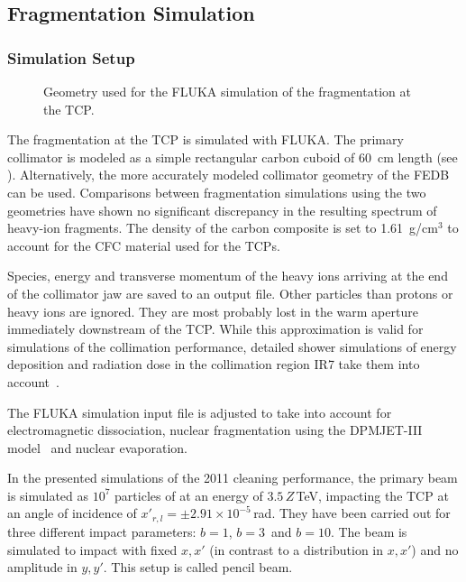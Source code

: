 \subsection{Fragmentation Simulation} \label{chap:STIERfrag}
%
\subsubsection{Simulation Setup}
%
\begin{figure}[t]
  \centering
  \def\svgwidth{0.65\linewidth}
  
  \caption{
    Geometry used for the FLUKA simulation of the fragmentation
    at the TCP.%
  }
  \label{pic:14112701}
\end{figure}
%
The fragmentation at the TCP is simulated with FLUKA. The primary collimator is modeled as a simple rectangular carbon cuboid of 60~cm length (see ). Alternatively, the more accurately modeled collimator geometry of the FEDB can be used. Comparisons between fragmentation simulations using the two geometries have shown no significant discrepancy in the resulting spectrum of heavy-ion fragments. The density of the carbon composite is set to 1.61~g/cm$^3$ to account for the CFC material used for the TCPs. 

Species, energy and transverse momentum of the heavy ions arriving at the end of the collimator jaw are saved to an output file. Other particles than protons or heavy ions are ignored. They are most probably lost in the warm aperture immediately downstream of the TCP. While this approximation is valid for simulations of the collimation performance, detailed shower simulations of energy deposition and radiation dose in the collimation region IR7 take them into account~\cite{NucDataSheet:120}.  

The FLUKA simulation input file is adjusted to take into account for electromagnetic dissociation, nuclear fragmentation using the DPMJET-III model~\cite{MC2000:DPMJETIII} and nuclear evaporation. 

In the presented simulations of the 2011 cleaning performance, the primary beam is simulated as $10^7$ particles of \lead at an energy of $3.5\,Z\,$TeV, impacting the TCP at an angle of incidence of $x'_{r,l}= \pm 2.91\times 10^{-5}\,$rad. They have been carried out for three different impact parameters: $b=1$\mum, $b = 3$\mum\, and $b=10$\mum. The beam is simulated to impact with fixed $x,x'$ (in contrast to a distribution in $x,x'$) and no amplitude in $y,y'$. This setup is called pencil beam.


